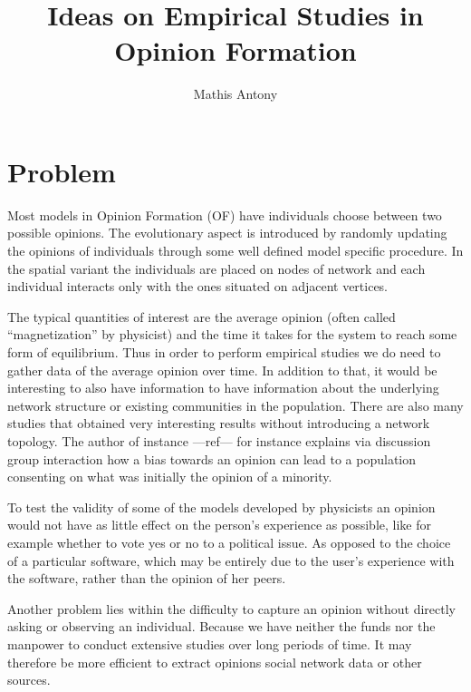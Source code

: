 \documentclass[a4paper]{scrartcl}
\begin{document}
\title{Ideas on Empirical Studies in Opinion Formation}
\author{Mathis Antony}
\maketitle
\tableofcontents
\section{Problem}
Most models in Opinion Formation (OF) have individuals choose between two possible opinions.
The evolutionary aspect is introduced by randomly updating the opinions of individuals through some well defined model specific procedure.
In the spatial variant the individuals are placed on nodes of network and each individual interacts only with the ones situated on adjacent vertices.

The typical quantities of interest are the average opinion (often called ``magnetization'' by physicist) and the time it takes for the system to reach some form of equilibrium.
Thus in order to perform empirical studies we do need to gather data of the average opinion over time.
In addition to that, it would be interesting to also have information to have
information about the underlying network structure or existing communities in
the population. There are also many studies that obtained very interesting
results without introducing a network topology. The author of instance
---ref--- for instance explains via discussion group interaction how a
bias towards an opinion can lead to a population consenting on what was
initially the opinion of a minority.

To test the validity of some of the models developed by physicists an opinion
would not have as little effect on the person's experience as possible, like for
example whether to vote yes or no to a political issue. As opposed to the choice 
of a particular software, which may be entirely due to the user's experience
with the software, rather than the opinion of her peers.

Another problem lies within the difficulty to capture an opinion without directly 
asking or observing an individual. Because we have neither the funds nor the
manpower to conduct extensive studies over long periods of time. It may
therefore be more efficient to extract opinions social network data or other
sources.

%
\end{document}
